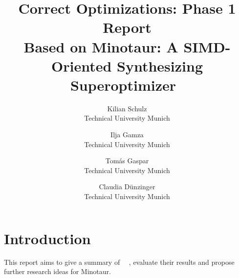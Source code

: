  \usepackage{tikz}
 \usepackage{amsmath}

 \usepackage[acronym]{glossaries}
 \makeglossaries 

 

 	\date{}
 	
 	\title{\Large \bf Correct Optimizations: Phase 1 Report\\
 		Based on Minotaur: A SIMD-Oriented Synthesizing Superoptimizer~\cite{liu24:Minotaur}}
 	
 	\author{
 		{\rm Kilian Schulz}\\
 		Technical University Munich
 		\and
 		{\rm Ilja Gamza}\\
 		Technical University Munich
 		\and
 		{\rm Tomás Gaspar}\\
 		Technical University Munich
 		\and
 		{\rm Claudia Dünzinger}\\
 	 	Technical University Munich
 	} %
 	
 	\maketitle
 	
 	
 	
 	\section{Introduction}
 	This report aims to give a summary of ~\citeauthor{liu24:Minotaur}~\cite{liu24:Minotaur}, evaluate their results and propose further research ideas for Minotaur.
 	

